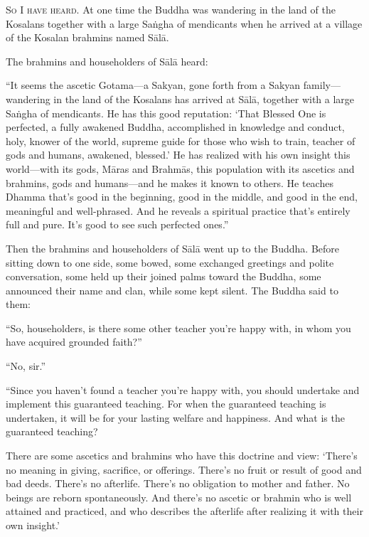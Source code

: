 \documentclass[12pt,openany]{book}%
\newcommand*{\scevam}[1]{\textsc{#1}}
\begin{document}
\scevam{So I have heard. }At one time the Buddha was wandering in the land of the Kosalans together with a large \textsanskrit{Saṅgha} of mendicants when he arrived at a village of the Kosalan brahmins named \textsanskrit{Sālā}. 

The brahmins and householders of \textsanskrit{Sālā} heard: 

“It seems the ascetic Gotama—a Sakyan, gone forth from a Sakyan family—wandering in the land of the Kosalans has arrived at \textsanskrit{Sālā}, together with a large \textsanskrit{Saṅgha} of mendicants. He has this good reputation: ‘That Blessed One is perfected, a fully awakened Buddha, accomplished in knowledge and conduct, holy, knower of the world, supreme guide for those who wish to train, teacher of gods and humans, awakened, blessed.’ He has realized with his own insight this world—with its gods, \textsanskrit{Māras} and \textsanskrit{Brahmās}, this population with its ascetics and brahmins, gods and humans—and he makes it known to others. He teaches Dhamma that’s good in the beginning, good in the middle, and good in the end, meaningful and well-phrased. And he reveals a spiritual practice that’s entirely full and pure. It’s good to see such perfected ones.” 

Then the brahmins and householders of \textsanskrit{Sālā} went up to the Buddha. Before sitting down to one side, some bowed, some exchanged greetings and polite conversation, some held up their joined palms toward the Buddha, some announced their name and clan, while some kept silent. The Buddha said to them: 

“So, householders, is there some other teacher you’re happy with, in whom you have acquired grounded faith?” 

“No, sir.” 

“Since you haven’t found a teacher you’re happy with, you should undertake and implement this guaranteed teaching. For when the guaranteed teaching is undertaken, it will be for your lasting welfare and happiness. And what is the guaranteed teaching? 

There are some ascetics and brahmins who have this doctrine and view: ‘There’s no meaning in giving, sacrifice, or offerings. There’s no fruit or result of good and bad deeds. There’s no afterlife. There’s no obligation to mother and father. No beings are reborn spontaneously. And there’s no ascetic or brahmin who is well attained and practiced, and who describes the afterlife after realizing it with their own insight.’ 
\end{document}
